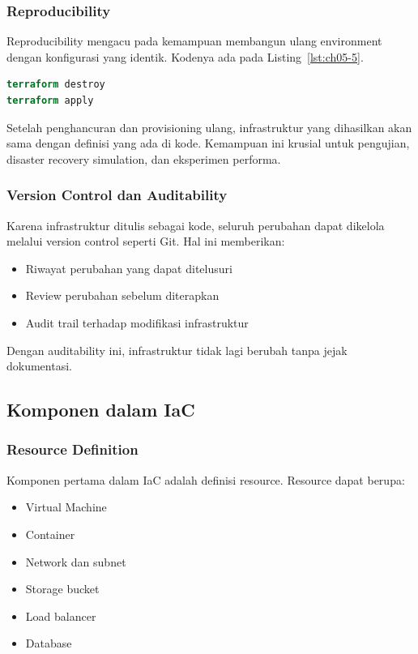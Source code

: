 \subsubsection*{Reproducibility}

Reproducibility mengacu pada kemampuan membangun ulang environment dengan konfigurasi yang identik. Kodenya ada pada Listing~\ref{lst:ch05-5}.

\begin{lstlisting}[language=terraform, caption={Potongan kode Terraform pada Reproducibility}, label={lst:ch05-5}]
terraform destroy
terraform apply
\end{lstlisting}

Setelah penghancuran dan provisioning ulang, infrastruktur yang dihasilkan akan sama dengan definisi yang ada di kode. Kemampuan ini krusial untuk pengujian, disaster recovery simulation, dan eksperimen performa.

\subsubsection*{Version Control dan Auditability}

Karena infrastruktur ditulis sebagai kode, seluruh perubahan dapat dikelola melalui version control seperti Git. Hal ini memberikan:

\begin{itemize}
\item Riwayat perubahan yang dapat ditelusuri
\item Review perubahan sebelum diterapkan
\item Audit trail terhadap modifikasi infrastruktur
\end{itemize}

Dengan auditability ini, infrastruktur tidak lagi berubah tanpa jejak dokumentasi.

\subsection{Komponen dalam IaC}

\subsubsection*{Resource Definition}

Komponen pertama dalam IaC adalah definisi resource. Resource dapat berupa:

\begin{itemize}
\item Virtual Machine
\item Container
\item Network dan subnet
\item Storage bucket
\item Load balancer
\item Database
\end{itemize}

